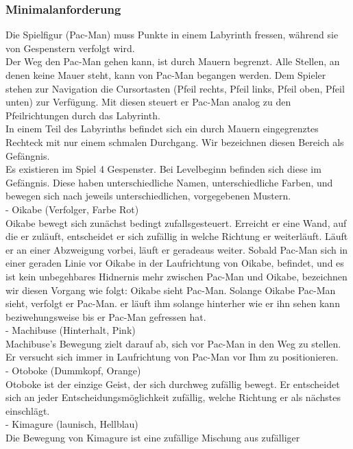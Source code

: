 \documentclass{article}
\begin{document}
\subsubsection{Minimalanforderung}
Die Spielfigur (Pac-Man) muss Punkte in einem Labyrinth fressen, während
sie von Gespenstern verfolgt wird.\\
Der Weg den Pac-Man gehen kann, ist durch Mauern begrenzt. Alle Stellen,
an denen keine Mauer steht, kann von Pac-Man begangen werden. Dem
Spieler stehen zur Navigation die Cursortasten (Pfeil rechts, Pfeil
links, Pfeil oben, Pfeil unten) zur Verfügung. Mit diesen steuert er
Pac-Man analog zu den Pfeilrichtungen durch das Labyrinth.\\
In einem Teil des Labyrinths befindet sich ein durch Mauern
eingegrenztes Rechteck mit nur einem schmalen Durchgang. Wir bezeichnen
diesen Bereich als Gefängnis.\\
Es existieren im Spiel 4 Gespenster. Bei Levelbeginn befinden sich diese
im Gefängnis. Diese haben unterschiedliche Namen, unterschiedliche
Farben, und bewegen sich nach jeweils unterschiedlichen, vorgegebenen
Mustern.\\
- Oikabe (Verfolger, Farbe Rot)\\
Oikabe bewegt sich zunächst bedingt zufallsgesteuert. Erreicht er eine
Wand, auf die er zuläuft, entscheidet er sich zufällig in welche
Richtung er weiterläuft. Läuft er an einer Abzweigung vorbei, läuft er
geradeaus weiter. Sobald Pac-Man sich in einer geraden Linie vor Oikabe
in der Laufrichtung von Oikabe, befindet, und es ist kein unbegehbares
Hidnernis mehr zwischen Pac-Man und Oikabe, bezeichnen wir diesen
Vorgang wie folgt: Oikabe sieht Pac-Man. Solange Oikabe Pac-Man sieht,
verfolgt er Pac-Man. er läuft ihm solange hinterher wie er ihn sehen
kann beziwehungsweise bis er Pac-Man gefressen hat. \\
- Machibuse (Hinterhalt, Pink)\\
Machibuse's Bewegung zielt darauf ab, sich vor Pac-Man in den Weg zu
stellen. Er versucht sich immer in Laufrichtung von Pac-Man vor Ihm zu
positionieren.\\
- Otoboke (Dummkopf, Orange)\\
Otoboke ist der einzige Geist, der sich durchweg zufällig bewegt. Er
entscheidet sich an jeder Entscheidungsmöglichkeit zufällig, welche
Richtung er als nächstes einschlägt.\\
- Kimagure (launisch, Hellblau)\\
Die Bewegung von Kimagure ist eine zufällige Mischung aus zufälliger
\end{document}
